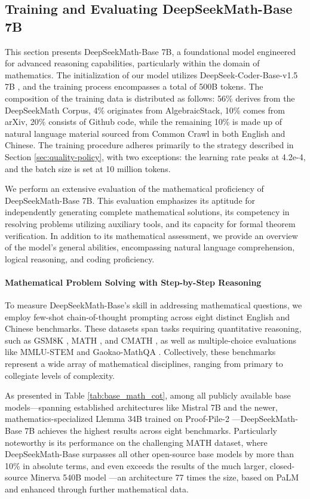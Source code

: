 \subsection{Training and Evaluating DeepSeekMath-Base 7B}

This section presents DeepSeekMath-Base 7B, a foundational model engineered for advanced reasoning capabilities, particularly within the domain of mathematics. The initialization of our model utilizes DeepSeek-Coder-Base-v1.5 7B \citep{deepseek-coder}, and the training process encompasses a total of 500B tokens. The composition of the training data is distributed as follows: 56\% derives from the DeepSeekMath Corpus, 4\% originates from AlgebraicStack, 10\% comes from arXiv, 20\% consists of Github code, while the remaining 10\% is made up of natural language material sourced from Common Crawl in both English and Chinese. The training procedure adheres primarily to the strategy described in Section \ref{sec:quality-policy}, with two exceptions: the learning rate peaks at 4.2e-4, and the batch size is set at 10 million tokens.

We perform an extensive evaluation of the mathematical proficiency of DeepSeekMath-Base 7B. This evaluation emphasizes its aptitude for independently generating complete mathematical solutions, its competency in resolving problems utilizing auxiliary tools, and its capacity for formal theorem verification. In addition to its mathematical assessment, we provide an overview of the model's general abilities, encompassing natural language comprehension, logical reasoning, and coding proficiency.

\paragraph{Mathematical Problem Solving with Step-by-Step Reasoning}

To measure DeepSeekMath-Base's skill in addressing mathematical questions, we employ few-shot chain-of-thought prompting \citep{cot} across eight distinct English and Chinese benchmarks. These datasets span tasks requiring quantitative reasoning, such as GSM8K \citep{gsm8k}, MATH \citep{MATH}, and CMATH \citep{wei2023cmath}, as well as multiple-choice evaluations like MMLU-STEM \citep{mmlu} and Gaokao-MathQA \citep{agieval}. Collectively, these benchmarks represent a wide array of mathematical disciplines, ranging from primary to collegiate levels of complexity.

As presented in Table \ref{tab:base_math_cot}, among all publicly available base models—spanning established architectures like Mistral 7B \citep{mistral} and the newer, mathematics-specialized Llemma 34B \citep{llemma} trained on Proof-Pile-2 \citep{llemma}—DeepSeekMath-Base 7B achieves the highest results across eight benchmarks. Particularly noteworthy is its performance on the challenging MATH dataset, where DeepSeekMath-Base surpasses all other open-source base models by more than 10\% in absolute terms, and even exceeds the results of the much larger, closed-source Minerva 540B model \citep{minerva}—an architecture 77 times the size, based on PaLM \citep{palm} and enhanced through further mathematical data.

